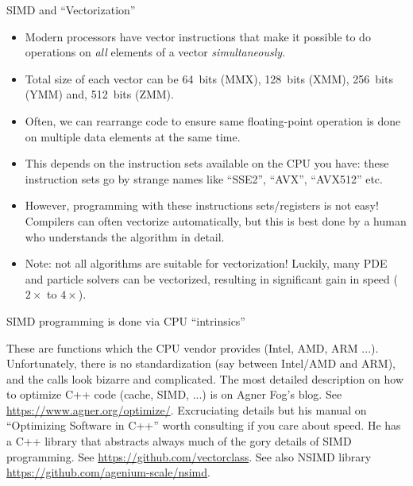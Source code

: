 \documentclass[aspectratio=169]{beamer}
\newcommand{\mypause}{}
\begin{document}
\begin{frame}{SIMD and ``Vectorization''}
  \begin{itemize}
  \item Modern processors have vector instructions that make it
    possible to do operations on \emph{all} elements of a vector
    \emph{simultaneously}.
  \item Total size of each vector can be 64~bits (MMX), 128~bits
    (XMM), 256~bits (YMM) and, 512~bits (ZMM).%
    \mypause%
  \item Often, we can rearrange code to ensure same floating-point
    operation is done on multiple data elements at the same time.
  \item This depends on the instruction sets available on the CPU you
    have: these instruction sets go by strange names like ``SSE2'',
    ``AVX'', ``AVX512'' etc.%
    \mypause%
  \item However, programming with these instructions sets/registers is
    not easy! Compilers can often vectorize automatically, but this is
    best done by a human who understands the algorithm in detail.%
    \mypause%
  \item Note: not all algorithms are suitable for vectorization!
    Luckily, many PDE and particle solvers can be vectorized,
    resulting in significant gain in speed ($2\times$ to $4\times$).
  \end{itemize}
\end{frame}

\begin{frame}{SIMD programming is done via CPU ``intrinsics''}

  These are functions which the CPU vendor provides (Intel, AMD, ARM
  ...). Unfortunately, there is no standardization (say between
  Intel/AMD and ARM), and the calls look bizarre and complicated.%
  \mypause%
  \vskip0.1in%
  The most detailed description on how to optimize C++ code (cache,
  SIMD, ...) is on Agner Fog's blog. See
  \url{https://www.agner.org/optimize/}. Excruciating details but his
  manual on ``Optimizing Software in C++'' worth consulting if you
  care about speed.%
  \mypause%
  \vskip0.1in%
  He has a C++ library that abstracts always much of the gory details
  of SIMD programming. See \url{https://github.com/vectorclass}. See
  also NSIMD library \url{https://github.com/agenium-scale/nsimd}.

\end{frame}
\end{document}

